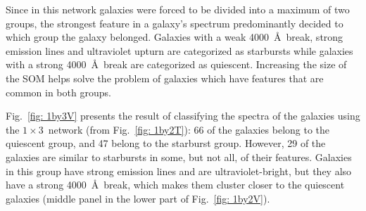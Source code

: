             Since in this network galaxies were forced to be divided into a maximum of two groups, the strongest feature in a galaxy's spectrum predominantly decided to which group the galaxy belonged.
            Galaxies with a weak 4000~\AA~break, strong emission lines and ultraviolet upturn are categorized as starbursts while galaxies with a strong 4000~\AA~break are categorized as quiescent.
            Increasing the size of the SOM helps solve the problem of galaxies which have features that are common in both groups.
            
            Fig.~\ref{fig: 1by3V} presents the result of classifying the spectra of the galaxies using the $1\times3$~network (from Fig.~\ref{fig: 1by2T}): 66 of the galaxies belong to the quiescent group, and 47 belong to the starburst group. 
            However, 29 of the galaxies are similar to starbursts in some, but not all, of their features. 
            Galaxies in this group have strong emission lines and are ultraviolet-bright, but they also have a strong 4000~\AA~break, which makes them cluster closer to the quiescent galaxies (middle panel in the lower part of Fig.~\ref{fig: 1by2V}).

